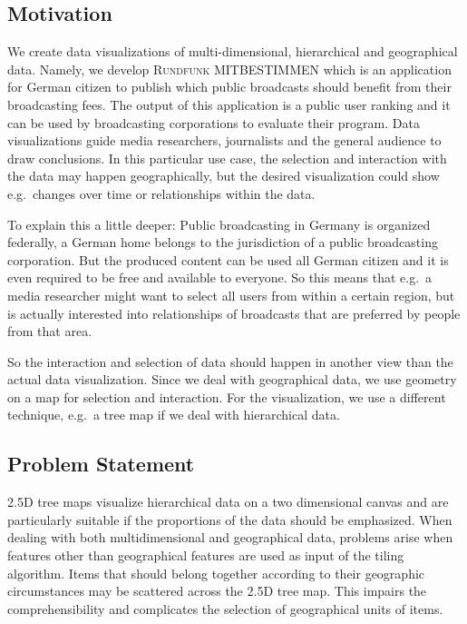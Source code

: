 \documentclass{article}
\newcommand{\rufu}{\textsc{Rundfunk MITBESTIMMEN}}
\newcommand{\tmap}{\textsc{2.5D} tree map}
\newcommand{\tmaps}{\textsc{2.5D} tree maps}
\begin{document}

\subsection{Motivation}\label{sec:outline}

We create data visualizations of multi-dimensional, hierarchical and geographical data.
Namely, we develop \rufu{} which is an application for German citizen to publish which public broadcasts should benefit from their broadcasting fees.
The output of this application is a public user ranking and it can be used by broadcasting corporations to evaluate their program.
Data visualizations guide media researchers, journalists and the general audience to draw conclusions.
In this particular use case, the selection and interaction with the data may happen geographically, but the desired visualization could show e.g.\ changes over time or relationships within the data.

To explain this a little deeper:
Public broadcasting in Germany is organized federally, a German home belongs to the jurisdiction of a public broadcasting corporation.
But the produced content can be used all German citizen and it is even required to be free and available to everyone.
So this means that e.g.\ a media researcher might want to select all users from within a certain region, but is actually interested into relationships of broadcasts that are preferred by people from that area.

So the interaction and selection of data should happen in another view than the actual data visualization.
Since we deal with geographical data, we use geometry on a map for selection and interaction.
For the visualization, we use a different technique, e.g.\ a tree map if we deal with hierarchical data.


\subsection{Problem Statement}


\tmaps{} visualize hierarchical data on a two dimensional canvas and are particularly suitable if the proportions of the data should be emphasized.
When dealing with both multidimensional and geographical data, problems arise when features other than geographical features are used as input of the tiling algorithm.
Items that should belong together according to their geographic circumstances may be scattered across the \tmap{}.
This impairs the comprehensibility and complicates the selection of geographical units of items.
\end{document}
